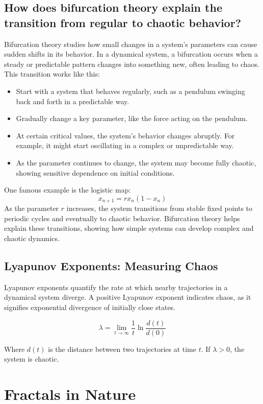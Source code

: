 \documentclass[12pt]{article}
\begin{document}
\subsection{How does bifurcation theory explain the transition from regular to chaotic behavior?}
Bifurcation theory studies how small changes in a system's parameters can cause sudden shifts in its behavior. In a dynamical system, a bifurcation occurs when a steady or predictable pattern changes into something new, often leading to chaos. This transition works like this:
\begin{itemize}
    \item Start with a system that behaves regularly, such as a pendulum swinging back and forth in a predictable way.
    \item Gradually change a key parameter, like the force acting on the pendulum.
    \item At certain critical values, the system's behavior changes abruptly. For example, it might start oscillating in a complex or unpredictable way.
    \item As the parameter continues to change, the system may become fully chaotic, showing sensitive dependence on initial conditions.
\end{itemize}

One famous example is the logistic map:
\[
x_{n+1} = r x_n (1 - x_n)
\]
As the parameter \( r \) increases, the system transitions from stable fixed points to periodic cycles and eventually to chaotic behavior. Bifurcation theory helps explain these transitions, showing how simple systems can develop complex and chaotic dynamics.

\subsection{Lyapunov Exponents: Measuring Chaos}
Lyapunov exponents quantify the rate at which nearby trajectories in a dynamical system diverge. A positive Lyapunov exponent indicates chaos, as it signifies exponential divergence of initially close states.

\[
\lambda = \lim_{t \to \infty} \frac{1}{t} \ln \frac{d(t)}{d(0)}
\]

Where \( d(t) \) is the distance between two trajectories at time \( t \). If \( \lambda > 0 \), the system is chaotic.

\section{Fractals in Nature}
\end{document}
